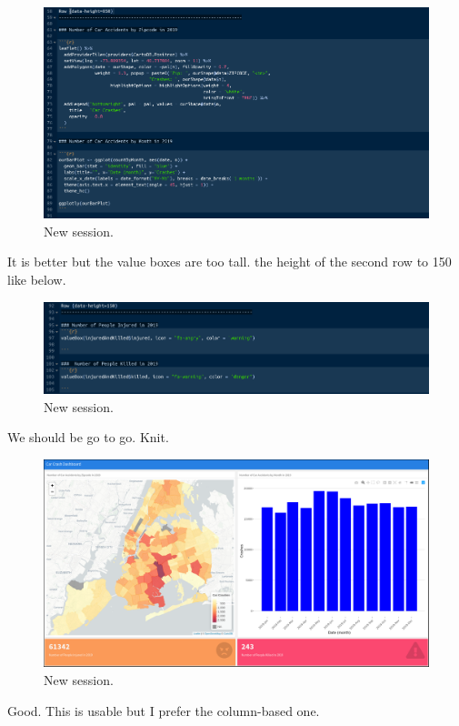 \documentclass[]{book}
\begin{document}
\begin{figure}
\centering
\includegraphics{flex17.png}
\caption{New session.}
\end{figure}

It is better but the value boxes are too tall. the height of the second row to 150 like below.

\begin{figure}
\centering
\includegraphics{flex18.png}
\caption{New session.}
\end{figure}

We should be go to go. Knit.

\begin{figure}
\centering
\includegraphics{flex19.png}
\caption{New session.}
\end{figure}

Good. This is usable but I prefer the column-based one.
\end{document}
